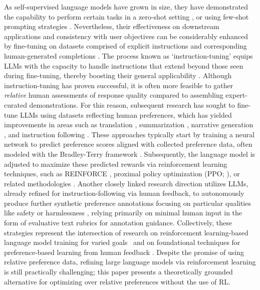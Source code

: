 As self-supervised language models have grown in size, they have demonstrated the capability to perform certain tasks in a zero-shot setting \citep{radford2019language}, or using few-shot prompting strategies \citep{gpt3,megatron,chowdhery2022palm}. Nevertheless, their effectiveness on downstream applications and consistency with user objectives can be considerably enhanced by fine-tuning on datasets comprised of explicit instructions and corresponding human-generated completions \citep{mishra-etal-2022-cross,sanh2022multitask,chung2022scaling,thoppilan2022lamda}. The process known as `instruction-tuning’ equips LLMs with the capacity to handle instructions that extend beyond those seen during fine-tuning, thereby boosting their general applicability \citep{chung2022scaling}. Although instruction-tuning has proven successful, it is often more feasible to gather \textit{relative} human assessments of response quality compared to assembling expert-curated demonstrations. For this reason, subsequent research has sought to fine-tune LLMs using datasets reflecting human preferences, which has yielded improvements in areas such as translation \citep{kreutzer-etal-2018-reliability}, summarization \citep{stiennon2022learning,ziegler2020finetuning}, narrative generation \citep{ziegler2020finetuning}, and instruction following \citep{ouyang2022training,ramamurthy2023is}. These approaches typically start by training a neural network to predict preference scores aligned with collected preference data, often modeled with the Bradley-Terry framework \citep{bradley1952rankanalysis}. Subsequently, the language model is adjusted to maximize these predicted rewards via reinforcement learning techniques, such as REINFORCE \citep{williams1992reinforce}, proximal policy optimization (PPO; \cite{schulman2017proximal}), or related methodologies \citep{ramamurthy2023is}. Another closely linked research direction utilizes LLMs, already refined for instruction-following via human feedback, to autonomously produce further synthetic preference annotations focusing on particular qualities like safety or harmlessness \citep{bai2022constitutional}, relying primarily on minimal human input in the form of evaluative text rubrics for annotation guidance. Collectively, these strategies represent the intersection of research on reinforcement learning-based language model training for varied goals~\citep{Ranzato2015SequenceLT,paulus2018a,wu2018learning} and on foundational techniques for preference-based learning from human feedback \citep{christiano2017deep,kupcsik2018learning}. Despite the promise of using relative preference data, refining large language models via reinforcement learning is still practically challenging; this paper presents a theoretically grounded alternative for optimizing over relative preferences without the use of RL.

